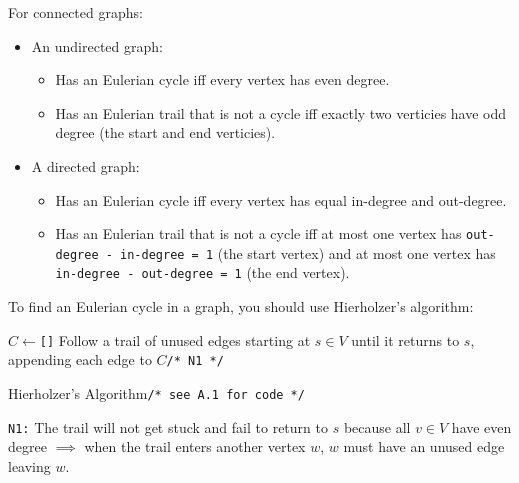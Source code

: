 \documentclass[12pt, titlepage]{article}
\begin{document}
For connected graphs:
\begin{itemize}
  \item An undirected graph:
  \begin{itemize}
    \item Has an Eulerian cycle iff every vertex has even degree.
    \item Has an Eulerian trail that is not a cycle iff exactly two verticies have odd degree (the start and end verticies).
  \end{itemize}
  \item A directed graph:
  \begin{itemize}
    \item Has an Eulerian cycle iff every vertex has equal in-degree and out-degree.
    \item Has an Eulerian trail that is not a cycle iff at most one vertex has \texttt{out-degree - in-degree = 1} (the start vertex) and at most one vertex has \texttt{in-degree - out-degree = 1} (the end vertex). \medskip
  \end{itemize}
\end{itemize}

To find an Eulerian cycle in a graph, you should use Hierholzer's algorithm: \medskip

\begin{algorithm}[H]
  \SetAlgoLined
  \DontPrintSemicolon
  $C \longleftarrow$\hspace{0.5mm}\texttt{[]}\;
  Follow a trail of unused edges starting at $s \in V$ until it returns to $s$, appending each edge to $C$\hspace{58mm}\texttt{/* N1 */}\;
  \;
  \caption{Hierholzer's Algorithm\hspace{5mm}\texttt{/* see A.1 for code */}}
\end{algorithm} \medskip

\texttt{N1:} The trail will not get stuck and fail to return to $s$ because all $v \in V$ have even degree $\implies$ when the trail enters another vertex $w$, $w$ must have an unused edge leaving $w$.
\end{document}
